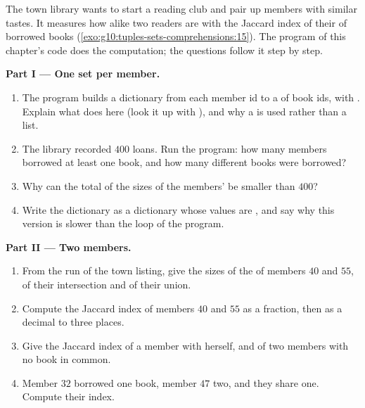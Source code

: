 \begin{problem}\label{pb:g10:tuples-sets-comprehensions:1}
The town library wants to start a reading club and pair up members with similar tastes. It measures how alike two
readers are with the Jaccard index of their  of borrowed books (\cref{exo:g10:tuples-sets-comprehensions:15}).
The program  of this chapter's code does the computation; the questions follow it
step by step.

\medskip\noindent\textbf{Part I --- One set per member.}
\begin{enumerate}
  \item The program builds a dictionary  from each member id to a  of book ids, with
    . Explain what  does here (look it up with
    ), and why a  is used rather than a list.
  \item The library recorded $400$ loans. Run the program: how many members borrowed at least one book, and how many
    different books were borrowed?
  \item Why can the total of the sizes of the members'  be smaller than $400$?
  \item Write the dictionary  as a dictionary  whose values are  , and
    say why this version is slower than the loop of the program.
\end{enumerate}

\medskip\noindent\textbf{Part II --- Two members.}
\begin{enumerate}[resume]
  \item From the run of the town listing, give the sizes of the  of members $40$ and $55$, of their
    intersection and of their union.
  \item Compute the Jaccard index of members $40$ and $55$ as a fraction, then as a decimal to three places.
  \item Give the Jaccard index of a member with herself, and of two members with no book in common.
  \item Member $32$ borrowed one book, member $47$ two, and they share one. Compute their index.
\end{enumerate}


\end{problem}
